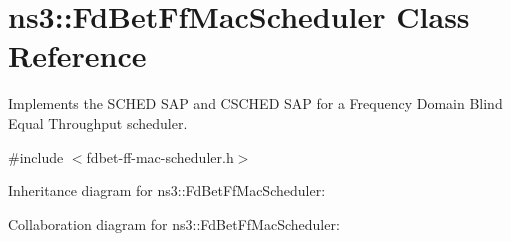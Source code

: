 \hypertarget{classns3_1_1FdBetFfMacScheduler}{}\section{ns3\+:\+:Fd\+Bet\+Ff\+Mac\+Scheduler Class Reference}
\label{classns3_1_1FdBetFfMacScheduler}


Implements the S\+C\+H\+ED S\+AP and C\+S\+C\+H\+ED S\+AP for a Frequency Domain Blind Equal Throughput scheduler.  




{\ttfamily \#include $<$fdbet-\/ff-\/mac-\/scheduler.\+h$>$}



Inheritance diagram for ns3\+:\+:Fd\+Bet\+Ff\+Mac\+Scheduler\+:


Collaboration diagram for ns3\+:\+:Fd\+Bet\+Ff\+Mac\+Scheduler\+:
